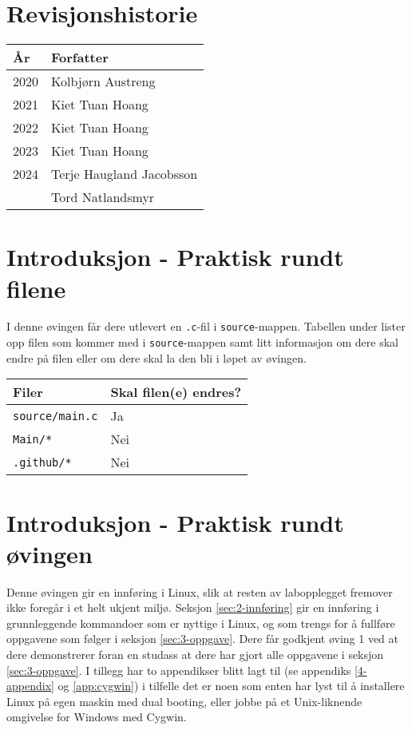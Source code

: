 
\section*{Revisjonshistorie}
\begin{center}
 \begin{tabular}{|p{1.5cm} p{5.5cm}|} 
 \hline
 År & Forfatter \\ [0.5ex] 
 \hline\hline
 2020 & Kolbjørn Austreng  \\ 
 \hline
 2021 & Kiet Tuan Hoang \\
 \hline
 2022 & Kiet Tuan Hoang \\
 \hline
  2023 & Kiet Tuan Hoang \\
 \hline
 2024 & Terje Haugland Jacobsson\\
 & Tord Natlandsmyr \\
 \hline
\end{tabular}
\end{center}

\section{Introduksjon - Praktisk rundt filene}

I denne øvingen får dere utlevert en \verb|.c|-fil i \verb|source|-mappen. Tabellen under lister opp filen som kommer med i \verb|source|-mappen samt litt informasjon om dere skal endre på filen eller om dere skal la den bli i løpet av øvingen.

\begin{center}
    \begin{tabular}{|p{8.5cm} p{5.5cm}|} 
    \hline
    \textbf{Filer} & \textbf{Skal filen(e) endres?}  \\ [0.5ex] 
    \hline\hline
    \verb|source/main.c| & Ja  \\ 
    \hline
    \verb|Main/*| & Nei  \\ 
    \hline
    \verb|.github/*| & Nei \\
    \hline 
    \end{tabular}
\end{center}

\section{Introduksjon - Praktisk rundt øvingen}
Denne øvingen gir en innføring i Linux, slik at resten av labopplegget fremover ikke foregår i et helt ukjent miljø. Seksjon \ref{sec:2-innføring} gir en innføring i grunnleggende kommandoer som er nyttige i Linux, og som trengs for å fullføre oppgavene som følger i seksjon \ref{sec:3-oppgave}. Dere får godkjent øving 1 ved at dere demonstrerer foran en studass at dere har gjort alle oppgavene i seksjon \ref{sec:3-oppgave}. 
I tillegg har to appendikser blitt lagt til (se appendiks \ref{4-appendix} og \ref{app:cygwin}) i tilfelle det er noen som enten har lyst til å installere Linux på egen maskin med dual booting, eller jobbe på et Unix-liknende omgivelse for Windows med Cygwin.



